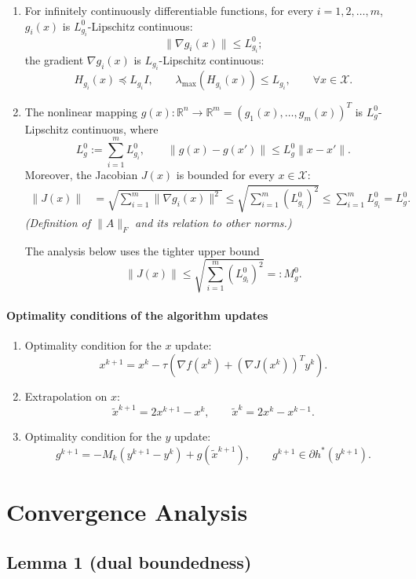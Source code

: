 \documentclass[11pt]{article}
\numberwithin{equation}{section}
\newcommand{\R}{\mathbb{R}}
\begin{document}
\begin{enumerate}
\item For infinitely continuously differentiable functions, for every $i=1,2,\ldots,m$, $g_i(x)$ is $L^0_{g_i}$-Lipschitz continuous:
\[
\|\nabla g_i(x)\|\le L^0_{g_i};
\]
the gradient $\nabla g_i(x)$ is $L_{g_i}$-Lipschitz continuous:
\[
H_{g_i}(x)\preceq L_{g_i}I,
\qquad \lambda_{\max}(H_{g_i}(x))\le L_{g_i},
\qquad \forall x\in\mathcal X.
\]

\item The nonlinear mapping $g(x):\R^n\to\R^m=(g_1(x),\ldots,g_m(x))^T$ is $L_g^0$-Lipschitz continuous, where
\[
L_g^0:=\sum_{i=1}^m L_{g_i}^0,
\qquad
\|g(x)-g(x')\|\le L_g^0\|x-x'\|.
\]
Moreover, the Jacobian $J(x)$ is bounded for every $x\in\mathcal X$:
\begin{align*}
\|J(x)\|
&=\sqrt{\sum_{i=1}^m\|\nabla g_i(x)\|^2}
\le \sqrt{\sum_{i=1}^m(L_{g_i}^0)^2}
\le \sum_{i=1}^mL_{g_i}^0=L_g^0.
\end{align*}
\emph{(Definition of $\|A\|_F$ and its relation to other norms.)}

The analysis below uses the tighter upper bound
\[
\|J(x)\|\le \sqrt{\sum_{i=1}^m(L_{g_i}^0)^2}=:M_g^0.
\]
\end{enumerate}

\paragraph{Optimality conditions of the algorithm updates}

\begin{enumerate}
\item Optimality condition for the $x$ update:
\[
x^{k+1}=x^k-\tau\left(\nabla f(x^k)+(\nabla J(x^k))^T y^k\right).
\]

\item Extrapolation on $x$:
\[
\widetilde{x}^{k+1}=2x^{k+1}-x^k,
\qquad
\widetilde{x}^{k}=2x^{k}-x^{k-1}.
\]

\item Optimality condition for the $y$ update:
\[
g^{k+1}=-M_k\left(y^{k+1}-y^k\right)+g(\widetilde{x}^{k+1}),
\qquad
g^{k+1}\in\partial h^*(y^{k+1}).
\]
\end{enumerate}

\section{Convergence Analysis}

\subsection*{Lemma 1 (dual boundedness)}
\end{document}
